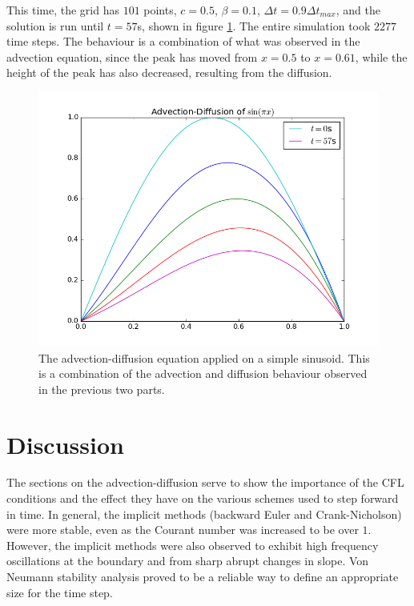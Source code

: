\documentclass[twocolumn]{article}
\begin{document}
This time, the grid has $101$ points, $c = 0.5$, $\beta = 0.1$,
$\Delta t = 0.9 \Delta t_{max}$, and the solution is run until $t =
57$s, shown in figure \ref{fig:advec_diffuse}. The entire simulation
took $2277$ time steps. The behaviour is a combination of what was
observed in the advection equation, since the peak has moved from
$x=0.5$ to $x=0.61$, while the height of the peak has also decreased,
resulting from the diffusion.

\begin{figure}
  \includegraphics[width=\linewidth]{advection_diffusion.png}
  \caption{
    The advection-diffusion equation applied on a simple
    sinusoid. This is a combination of the advection and diffusion
    behaviour observed in the previous two parts.
  }
  \label{fig:advec_diffuse}
\end{figure}

\section{Discussion}

The sections on the advection-diffusion serve to show the importance
of the CFL conditions and the effect they have on the various schemes
used to step forward in time. In general, the implicit methods
(backward Euler and Crank-Nicholson) were more stable, even as the
Courant number was increased to be over $1$. However, the implicit
methods were also observed to exhibit high frequency oscillations at
the boundary and from sharp abrupt changes in slope. Von Neumann
stability analysis proved to be a reliable way to define an
appropriate size for the time step.

\end{document}
